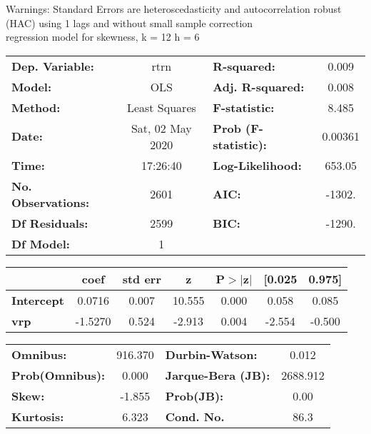Warnings: \newline
 [1] Standard Errors are heteroscedasticity and autocorrelation robust (HAC) using 1 lags and without small sample correction\\ 

regression model for skewness, k = 12 h = 6\begin{center}
\begin{tabular}{lclc}
\toprule
\textbf{Dep. Variable:}    &       rtrn       & \textbf{  R-squared:         } &     0.009   \\
\textbf{Model:}            &       OLS        & \textbf{  Adj. R-squared:    } &     0.008   \\
\textbf{Method:}           &  Least Squares   & \textbf{  F-statistic:       } &     8.485   \\
\textbf{Date:}             & Sat, 02 May 2020 & \textbf{  Prob (F-statistic):} &  0.00361    \\
\textbf{Time:}             &     17:26:40     & \textbf{  Log-Likelihood:    } &    653.05   \\
\textbf{No. Observations:} &        2601      & \textbf{  AIC:               } &    -1302.   \\
\textbf{Df Residuals:}     &        2599      & \textbf{  BIC:               } &    -1290.   \\
\textbf{Df Model:}         &           1      & \textbf{                     } &             \\
\bottomrule
\end{tabular}
\begin{tabular}{lcccccc}
                   & \textbf{coef} & \textbf{std err} & \textbf{z} & \textbf{P$> |$z$|$} & \textbf{[0.025} & \textbf{0.975]}  \\
\midrule
\textbf{Intercept} &       0.0716  &        0.007     &    10.555  &         0.000        &        0.058    &        0.085     \\
\textbf{vrp}       &      -1.5270  &        0.524     &    -2.913  &         0.004        &       -2.554    &       -0.500     \\
\bottomrule
\end{tabular}
\begin{tabular}{lclc}
\textbf{Omnibus:}       & 916.370 & \textbf{  Durbin-Watson:     } &    0.012  \\
\textbf{Prob(Omnibus):} &   0.000 & \textbf{  Jarque-Bera (JB):  } & 2688.912  \\
\textbf{Skew:}          &  -1.855 & \textbf{  Prob(JB):          } &     0.00  \\
\textbf{Kurtosis:}      &   6.323 & \textbf{  Cond. No.          } &     86.3  \\
\bottomrule
\end{tabular}
\end{center}

